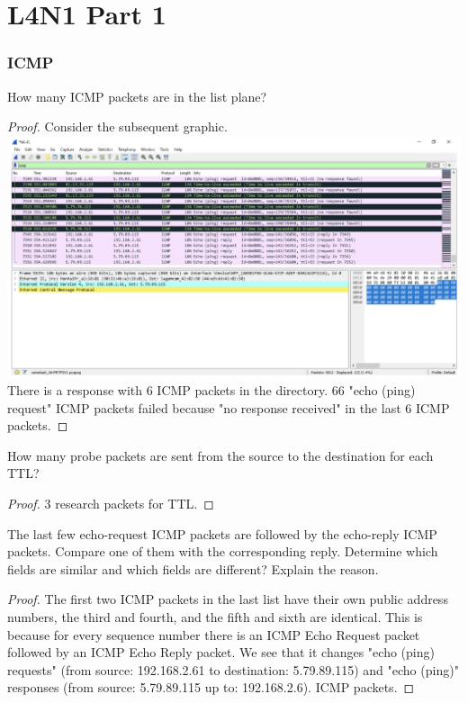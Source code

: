 \documentclass[../main.tex]{subfiles}
\begin{document}
\section*{L4N1 Part 1} 
\subsubsection*{ICMP}
\newpage
{}
\begin{wts}
    How many ICMP packets are in the list plane?
\end{wts}
\begin{proof}
    Consider the subsequent graphic.\\
    \includegraphics[width=\textwidth]{subfiles/images/PART1_FIG1.png}
    There is a response with 6 ICMP packets in the directory. 66 "echo (ping) request" ICMP packets failed because "no response received" in the last 6 ICMP packets.
\end{proof}
\newpage

\begin{wts}
    How many probe packets are sent from the source to the destination for each TTL?
\end{wts}
\begin{proof}
    3 research packets for TTL.
\end{proof}
\newpage

\begin{wts}
    The last few echo-request ICMP packets are followed by the echo-reply ICMP packets. Compare one of them with the corresponding reply. Determine which fields are similar and which fields are different? Explain the reason.
\end{wts}
\begin{proof}
    The first two ICMP packets in the last list have their own public address numbers, the third and fourth, and the fifth and sixth are identical. This is because for every sequence number there is an ICMP Echo Request packet followed by an ICMP Echo Reply packet. We see that it changes "echo (ping) requests" (from source: 192.168.2.61 to destination: 5.79.89.115) and "echo (ping)" responses (from source: 5.79.89.115 up to: 192.168.2.6). ICMP packets.
\end{proof}
\newpage
\end{document}
